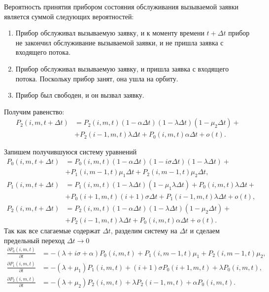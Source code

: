 Вероятность принятия прибором состояния обслуживания вызываемой заявки является суммой следующих вероятностей:
\begin{enumerate}
	\item Прибор обслуживал вызываемую заявку, и к моменту времени $t+\Delta t$ прибор не закончил обслуживание вызываемой заявки, и не пришла заявка с входящего потока.
	\item Прибор обслуживал вызываемую заявку, и пришла заявка с входящего потока. Поскольку прибор занят, она ушла на орбиту.
	\item Прибор был свободен, и он вызвал заявку.
\end{enumerate}
Получим равенство:
\begin{equation*}
	\begin{split}
	P_{2}(i,m,t+\Delta t) &=P_{2}(i,m,t)(1-\alpha\Delta t)(1 - \lambda\Delta t)(1 - \mu_{2}\Delta t)+ \\ &+ P_{2}(i-1,m,t)\lambda\Delta t + P_{0}(i,m,t)\alpha\Delta t + o(t).
\end{split}
\end{equation*}

Запишем получившуюся систему уравнений
\begin{equation*} 
	\begin{split}
		P_{0}(i,m,t+\Delta t)&=P_{0}(i,m,t)(1-\alpha\Delta t)(1 - i\sigma\Delta t)(1-\lambda\Delta t) +\\ &+ P_{1}(i,m-1,t)\mu_{1}\Delta t + P_{2}(i,m-1,t)\mu_{2}\Delta t,
		\\
		P_{1}(i,m,t+\Delta t)&=P_{1}(i,m,t)(1-\lambda\Delta t)(1-\mu_{1}\lambda\Delta t)+P_{0}(i,m,t)\lambda\Delta t +\\ &+ P_{0}(i+1,m,t)(i+1)\sigma\Delta t + P_{1}(i-1,m,t)\lambda\Delta t + o(t),
		\\
		P_{2}(i,m,t+\Delta t)&=P_{2}(i,m,t)(1-\alpha\Delta t)(1 - \lambda\Delta t)(1 - \mu_{2}\Delta t) +\\ &+ P_{2}(i-1,m,t)\lambda\Delta t + P_{0}(i,m,t)\alpha\Delta t + o(t).
	\end{split}
\end{equation*}
Так как все слагаемые содержат $\Delta t$, разделим систему на $\Delta t$ и сделаем предельный переход $\Delta t \rightarrow 0$
\begin{equation} \label{kolmogorov_equations_summary}
	\begin{split}
		\frac{{\partial P_{0}(i,m,t)}}{{\partial t}} &= -(\lambda + i\sigma + \alpha)P_{0}(i,m,t) + P_{1}(i,m-1,t)\mu_{1} + P_{2}(i,m-1,t)\mu_{2},
		\\
		\frac{{\partial P_{1}(i,m,t)}}{{\partial t}} &= -(\lambda + \mu_{1})P_{1}(i,m,t) + (i+1)\sigma P_{0}(i+1,m,t) + \lambda  P_{0}(i,m,t),
		\\
		\frac{{\partial P_{2}(i,m,t)}}{{\partial t}} &= -(\lambda + \mu_{2})P_{2}(i,m,t) + \lambda P_{2}(i-1,m,t) + \alpha  P_{0}(i,m,t).
	\end{split}
\end{equation}	

